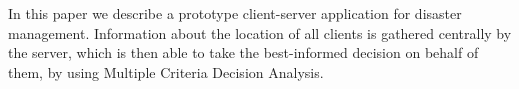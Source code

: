 In this paper we describe a prototype client-server application for disaster
management. Information about the location of all clients is gathered
centrally by the server, which is then able to take the best-informed decision
on behalf of them, by using Multiple Criteria Decision Analysis.
